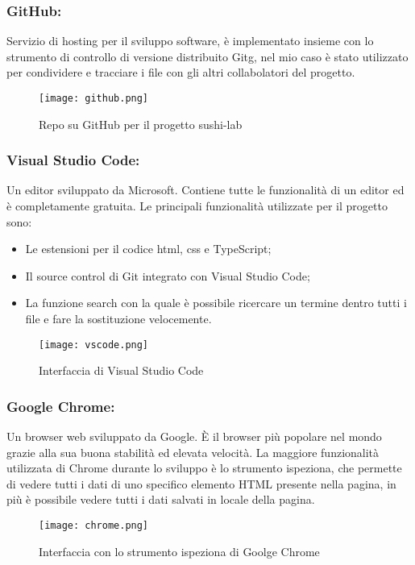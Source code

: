 \subsubsection{GitHub:}
Servizio di hosting per il sviluppo software, è implementato insieme con lo strumento di controllo di versione distribuito \gls{Gitg}, nel mio caso è stato utilizzato per condividere e tracciare i file con gli altri collabolatori del progetto.
\begin{figure}[H]
    \centering
    \texttt{[image: github.png]}
    \caption{Repo su GitHub per il progetto sushi-lab}
\end{figure}
\subsubsection{Visual Studio Code:}
Un editor sviluppato da Microsoft. Contiene tutte le funzionalità di un editor ed è completamente gratuita. Le principali funzionalità utilizzate per il progetto sono:
\begin{itemize}
    \item Le estensioni per il codice html, css e TypeScript;
    \item Il source control di Git integrato con Visual Studio Code;
    \item La funzione search con la quale è possibile ricercare un termine dentro tutti i file e fare la sostituzione velocemente.
\end{itemize}
\begin{figure}[H]
    \centering
    \texttt{[image: vscode.png]}
    \caption{Interfaccia di Visual Studio Code}
\end{figure}
\subsubsection{Google Chrome:}
Un browser web sviluppato da Google. È il browser più popolare nel mondo grazie alla sua buona stabilità ed elevata velocità. La maggiore funzionalità utilizzata di Chrome durante lo sviluppo è lo strumento ispeziona, che permette di vedere tutti i dati di uno specifico elemento HTML presente nella pagina, in più è possibile vedere tutti i dati salvati in locale della pagina.
\begin{figure}[H]
    \centering
    \texttt{[image: chrome.png]}
    \caption{Interfaccia con lo strumento ispeziona di Goolge Chrome}
\end{figure}
    
